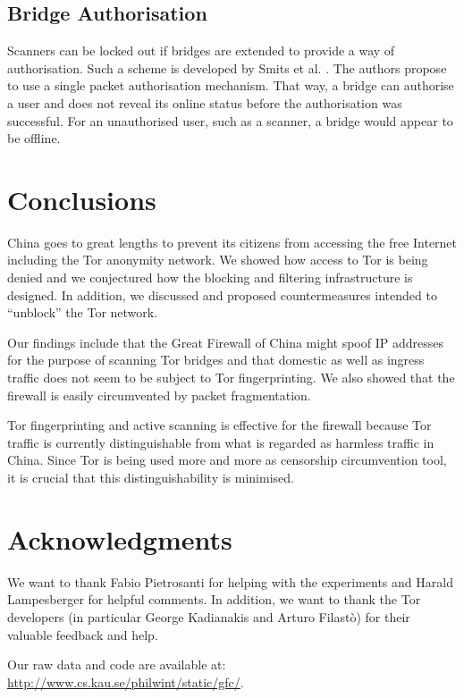 \documentclass[runningheads,a4paper]{llncs}
\begin{document}
\subsection{Bridge Authorisation}
Scanners can be locked out if bridges are extended to provide a way of authorisation. Such a scheme
is developed by Smits et al. \cite{Smits2011}. The authors propose to use a single packet
authorisation mechanism. That way, a bridge can authorise a user and does not reveal its online
status before the authorisation was successful. For an unauthorised user, such as a scanner, a
bridge would appear to be offline.


\section{Conclusions}
\label{sec:conclusion}
China goes to great lengths to prevent its citizens from accessing the free Internet including the
Tor anonymity network. We showed how access to Tor is being denied and we conjectured how the
blocking and filtering infrastructure is designed. In addition, we discussed and proposed
countermeasures intended to ``unblock'' the Tor network.

Our findings include that the Great Firewall of China might spoof IP addresses for the purpose of
scanning Tor bridges and that domestic as well as ingress traffic does not seem to be subject to Tor
fingerprinting. We also showed that the firewall is easily circumvented by packet fragmentation.

Tor fingerprinting and active scanning is effective for the firewall because Tor traffic is
currently distinguishable from what is regarded as harmless traffic in China. Since Tor is being
used more and more as censorship circumvention tool, it is crucial that this distinguishability is
minimised.


\section*{Acknowledgments}
\label{sec:acks}
We want to thank Fabio Pietrosanti for helping with the experiments and Harald Lampesberger for
helpful comments. In addition, we want to thank the Tor developers (in particular George Kadianakis
and Arturo Filast\`{o}) for their valuable feedback and help.

Our raw data and code are available at: \\
\url{http://www.cs.kau.se/philwint/static/gfc/}.




\end{document}
